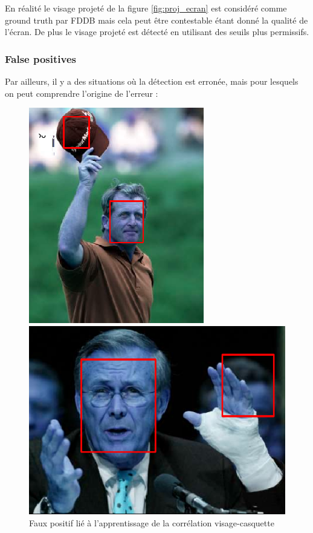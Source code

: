 \documentclass[a4paper,11pt]{article}
\begin{document}
	    En réalité le visage projeté de la figure \ref{fig:proj_ecran} est considéré comme ground truth par FDDB mais cela peut être contestable étant donné la qualité de l'écran. De plus le visage projeté est détecté en utilisant des seuils plus permissifs.\\
	    
	\subsubsection{False positives}
	    
	    Par ailleurs, il y a des situations où la détection est erronée, mais pour lesquels on peut comprendre l'origine de l'erreur :\\
	    
	    \begin{figure}[H]
	        \centering
	        \begin{minipage}[c]{0.45\linewidth}
	            \begin{center}
	                \includegraphics[scale=0.60]{facenetFP1.png}
	                \caption{Faux positif lié à l'apprentissage de la corrélation visage-casquette}
	            \end{center}
	        \end{minipage} \hfill
	        \begin{minipage}[c]{0.45\linewidth}
	            \begin{center}
	                \includegraphics[scale=0.45]{facenetFP2.png}

\end{center}
\end{minipage}
\end{figure}
\end{document}
